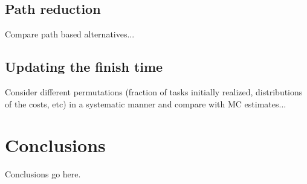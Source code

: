 \documentclass[12pt]{article}
\begin{document}

\subsection{Path reduction}
\label{subsect.results_paths}

Compare path based alternatives...

\subsection{Updating the finish time}
\label{subsect.results_updating}

Consider different permutations (fraction of tasks initially realized, distributions of the costs, etc) in a systematic manner and compare with MC estimates... 

\section{Conclusions}
\label{sect.conclusions}

Conclusions go here. 



\end{document}
